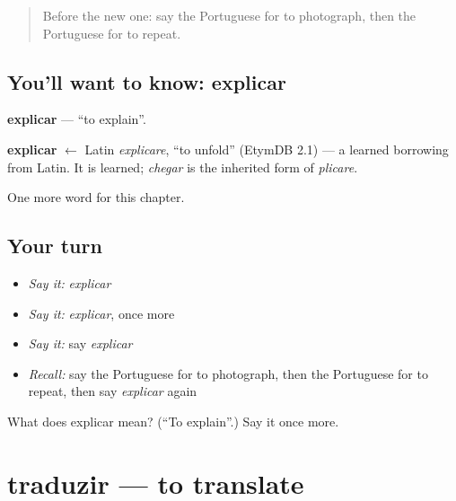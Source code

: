 \label{lesson:PT-C231-explicar}



\begin{quote}
Before the new one: say the Portuguese for to photograph, then the Portuguese for to repeat.
\end{quote}

\subsection*{You'll want to know: explicar}
\textbf{explicar} — \textquotedblleft{}to explain\textquotedblright{}.

\begin{cousinweb}
\textbf{explicar} $\leftarrow$ Latin \emph{explicare}, \textquotedblleft{}to unfold\textquotedblright{} (EtymDB 2.1) — a learned borrowing from Latin. It is learned; \emph{chegar} is the inherited form of \emph{plicare}.
\end{cousinweb}

\begin{grammarlens}[title={What you've built}]
One more word for this chapter.
\end{grammarlens}

\subsection*{Your turn}
\begin{itemize}
\raggedright
  \item \emph{Say it:} \emph{explicar}
  \item \emph{Say it:} \emph{explicar}, once more
  \item \emph{Say it:} say \emph{explicar}
  \item \emph{Recall:} say the Portuguese for to photograph, then the Portuguese for to repeat, then say \emph{explicar} again
\end{itemize}

\begin{tcolorbox}[breakable,colback=teal!4,colframe=teal!35!black,title={Before you move on}]
What does explicar mean? (\textquotedblleft{}To explain\textquotedblright{}.) Say it once more.
\end{tcolorbox}
\section[traduzir]{traduzir — to translate}

\label{lesson:PT-C231-traduzir}



